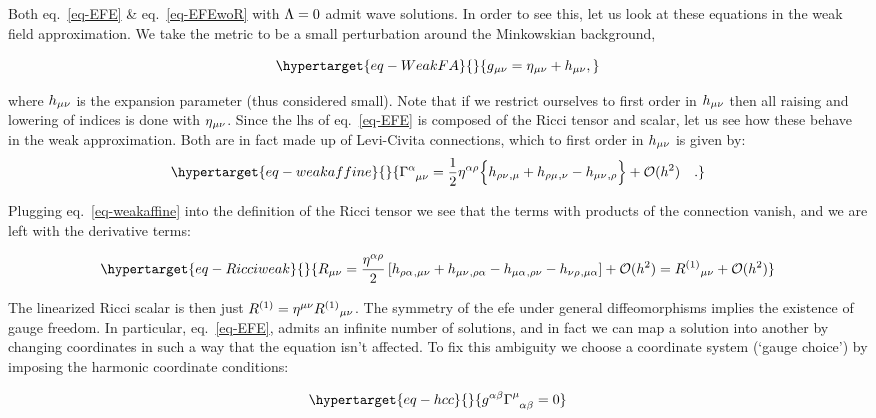 \documentclass[
  11pt,
  a4paper,
  DIV=11,
  numbers=noendperiod,
  twoside]{scrreprt}
\DeclareRobustCommand{\[}{\begin{equation}}
\DeclareRobustCommand{\]}{\end{equation}}
\begin{document}
Both eq.~\ref{eq-EFE} \& eq.~\ref{eq-EFEwoR} with \(\Lambda=0\) admit
wave solutions. In order to see this, let us look at these equations in
the weak field approximation. We take the metric to be a small
perturbation around the Minkowskian background,

\begin{equation}\protect\hypertarget{eq-WeakFA}{}{
    \met = \mink + \weakmet,
}\label{eq-WeakFA}\end{equation}

where \(h{}_{\mu\nu}\) is the expansion parameter (thus considered small).
Note that if we restrict ourselves to first order in \(h{}_{\mu\nu}\) then
all raising and lowering of indices is done with \(\eta{}_{\mu\nu}\). Since the
\gls{lhs} of eq.~\ref{eq-EFE} is composed of the Ricci tensor and
scalar, let us see how these behave in the weak approximation. Both are
in fact made up of Levi-Civita connections, which to first order in
\(h{}_{\mu\nu}\) is given by:
\begin{equation}\protect\hypertarget{eq-weakaffine}{}{
\LC{\alpha}{\mu}{\nu} = \frac{1}{2} \invmink[\alpha \rho]
\brk[\Big]{
    \ipdv{ \weakmet[\rho \nu]}{\mu}
    +\ipdv{ \weakmet[\rho \mu]}{\nu}
    -\ipdv{ \weakmet}{\rho}} + \order[2]{h}\quad .
}\label{eq-weakaffine}\end{equation}

Plugging eq.~\ref{eq-weakaffine} into the definition of the Ricci tensor
we see that the terms with products of the connection vanish, and we are
left with the derivative terms:

\begin{equation}\protect\hypertarget{eq-Ricciweak}{}{ 
\RicciTco  =
 \frac{\invmink[\alpha\rho]}{2}\left[ \ipdv{\weakmet[\rho\alpha]}{\mu\nu} + \ipdv{\weakmet}{\rho\alpha} - \ipdv{\weakmet[\mu\alpha]}{\rho\nu} - \ipdv{\weakmet[\nu\rho]}{\mu\alpha} \right] + \mathcal{O}(h^2)=\linRicciTco+ \mathcal{O}(h^2)
}\label{eq-Ricciweak}\end{equation}

The linearized Ricci scalar is then just
\(R^{(1)}=\eta{}^{\mu\nu}R^{(1)}{}_{\mu\nu}\). The symmetry of the \gls{efe} under
general diffeomorphisms implies the existence of gauge freedom. In
particular, eq.~\ref{eq-EFE}, admits an infinite number of solutions,
and in fact we can map a solution into another by changing coordinates
in such a way that the equation isn't affected. To fix this ambiguity we
choose a coordinate system (`gauge choice') by imposing the harmonic
coordinate conditions:

\begin{equation}\protect\hypertarget{eq-hcc}{}{ 
   \invmet[\alpha\beta]\LC{\mu}{\alpha}{\beta} =0
}\label{eq-hcc}\end{equation}
\end{document}

